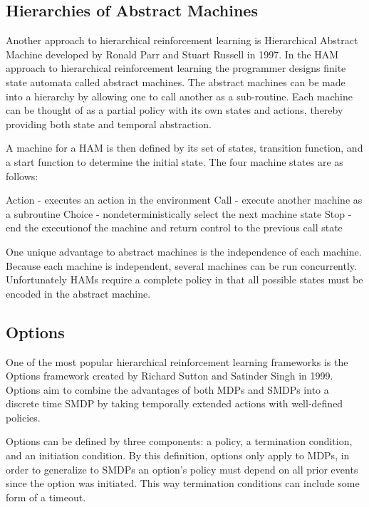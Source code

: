 \subsection{Hierarchies of Abstract Machines}

\par Another approach to hierarchical reinforcement learning is Hierarchical Abstract Machine developed by Ronald Parr and Stuart Russell in 1997. In the HAM approach to hierarchical reinforcement learning the programmer designs finite state automata called abstract machines. The abstract machines can be made into a hierarchy by allowing one to call another as a sub-routine. Each machine can be thought of as a partial policy with its own states and actions, thereby providing both state and temporal abstraction.

\par A machine for a HAM is then defined by its set of states, transition function, and a start function to determine the initial state. The four machine states are as follows:

\begin{outline}
\1 Action - executes an action in the environment
\1 Call - execute another machine as a subroutine
\1 Choice - nondeterministically select the next machine state
\1 Stop - end the executionof the machine and return control to the previous call state
\end{outline}

\par One unique advantage to abstract machines is the independence of each machine. Because each machine is independent, several machines can be run concurrently. Unfortunately HAMs require a complete policy in that all possible states must be encoded in the abstract machine.

\subsection{Options}

\par One of the most popular hierarchical reinforcement learning frameworks is the Options framework created by Richard Sutton and Satinder Singh in 1999. Options aim to combine the advantages of both MDPs and SMDPs into a discrete time SMDP by taking temporally extended actions with well-defined policies.

\par Options can be defined by three components: a policy, a termination condition, and an initiation condition. By this definition, options only apply to MDPs, in order to generalize to SMDPs an option's policy must depend on all prior events since the option was initiated. This way termination conditions can include some form of a timeout.

